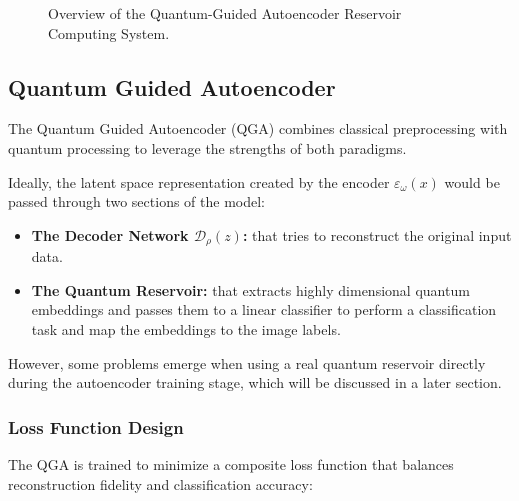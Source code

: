 \documentclass[conference]{IEEEtran}
\begin{document}
\begin{figure}[!ht]
    \centering
    \label{fig:qgars_pipeline}
    \caption{Overview of the Quantum-Guided Autoencoder Reservoir Computing System.}
\end{figure}

\subsection{Quantum Guided Autoencoder}
The Quantum Guided Autoencoder (QGA) combines classical 
preprocessing with quantum processing to leverage 
the strengths of both paradigms.

Ideally, the latent space representation created by the encoder \(\varepsilon_\omega(x)\)
would be passed through two sections of the model:
\begin{itemize}
    \item \textbf{The Decoder Network \(\mathcal{D}_\rho(z)\):}
    that tries to reconstruct the original input data.
    \item \textbf{The Quantum Reservoir:}
    that extracts highly dimensional quantum embeddings and
    passes them to a linear classifier to perform a classification
    task and map the embeddings to the image labels.
\end{itemize}
However, some problems emerge when using a real quantum reservoir directly during the autoencoder training stage, which will be discussed in a later section.

\subsubsection{Loss Function Design}
The QGA is trained to minimize a composite loss 
function that balances reconstruction fidelity and 
classification accuracy:
\end{document}

